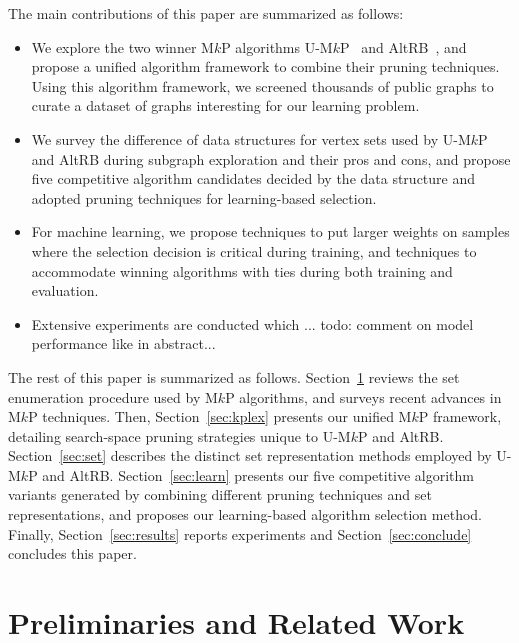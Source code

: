 \documentclass[sigconf,anonymous,review]{acmart}
\begin{document}
The main contributions of this paper are summarized as follows:
\begin{itemize}
\item We explore the two winner M$k$P algorithms U-M$k$P~\cite{akhlaque_vldb} and AltRB~\cite{clong_vldb}, and propose a unified algorithm framework to combine their pruning techniques. Using this algorithm framework, we screened thousands of public graphs to curate a dataset of graphs interesting for our learning problem.
\item We survey the difference of data structures for vertex sets used by U-M$k$P and AltRB during subgraph exploration and their pros and cons, and propose five competitive algorithm candidates decided by the data structure and adopted pruning techniques for learning-based selection.
\item For machine learning, we propose techniques to put larger weights on samples where the selection decision is critical during training, and techniques to accommodate winning algorithms with ties during both training and evaluation.
\item Extensive experiments are conducted which {\color{red}... todo: comment on model performance like in abstract...}
\end{itemize}

The rest of this paper is summarized as follows. Section~\ref{sec:related} reviews the set enumeration procedure used by M$k$P algorithms, and surveys recent advances in M$k$P techniques. Then, Section~\ref{sec:kplex} presents our unified M$k$P framework, detailing search-space pruning strategies unique to U-M$k$P and AltRB. Section~\ref{sec:set} describes the distinct set representation methods employed by U-M$k$P and AltRB. Section~\ref{sec:learn} presents our five competitive algorithm variants generated by combining different pruning techniques and set representations, and proposes our learning-based algorithm selection method. Finally, Section~\ref{sec:results} reports experiments and Section~\ref{sec:conclude} concludes this paper.

\vspace{-1mm}
\section{Preliminaries and Related Work}\label{sec:related}
\end{document}
